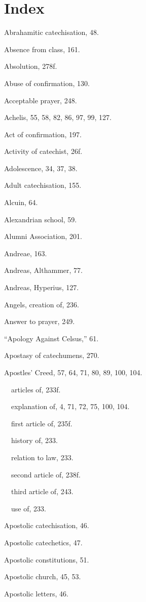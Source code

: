 \chapter{Index}
\begin{originalinhalt}

Abrahamitic catechisation, 48.

Absence from class, 161.

Absolution, 278f.

Abuse of confirmation, 130.

Acceptable prayer, 248.

Achelis, 55, 58, 82, 86, 97, 99, 127.

Act of confirmation, 197.

Activity of catechist, 26f.

Adolescence, 34, 37, 38.

Adult catechisation, 155.

Alcuin, 64.

Alexandrian school, 59.

Alumni Association, 201.

Andreae, 163.

Andreas, Althammer, 77.

Andreas, Hyperius, 127.

Angels, creation of, 236.

Answer to prayer, 249.

“Apology Against Celsus,” 61.

Apostasy of catechumens, 270.

Apostles’ Creed, 57, 64, 71, 80, 89, 100, 104.

 articles of, 233f.

 explanation of, 4, 71, 72, 75, 100, 104.

 first article of, 235f.

 history of, 233.

 relation to law, 233.

 second article of, 238f.

 third article of, 243.

 use of, 233.

Apostolic catechisation, 46.

Apostolic catechetics, 47.

Apostolic constitutions, 51.

Apostolic church, 45, 53.

Apostolic letters, 46.


\end{originalinhalt}
